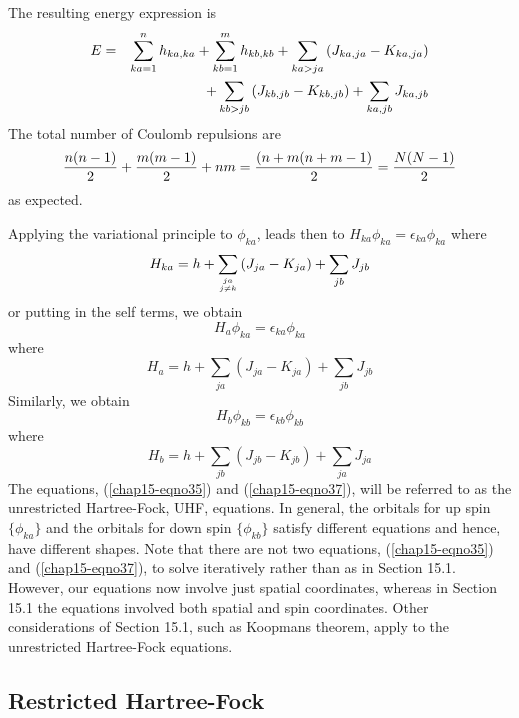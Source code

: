 The resulting energy expression is
\begin{eqnarray}
E &=& \sum^{n}_{ka=1} h_{ka,ka} + \sum^{m}_{kb=1} h_{kb,kb} + 
\sum_{ka>ja} \left( J_{ka,ja} - K_{ka,ja} \right)\cr
&& + \sum_{kb>jb} \left( J_{kb,jb} - K_{kb,jb} \right) + \sum_{ka,jb} 
J_{ka,jb}
\label{chap15-eqno34}
\end{eqnarray}
The total number of Coulomb repulsions are
\begin{equation}
{n(n-1) \over 2} + {m(m-1) \over 2} + nm = {(n+m(n+m-1) \over 2} = 
{N(N-1) \over 2}
\end{equation}
as expected.

Applying the variational principle to $\phi_{ka}$, leads then to 
$H_{ka} \phi_{ka} = \epsilon_{ka} \phi_{ka}$ where
\begin{equation}
H_{ka} = h + \sum_{{ja \atop j \not= k}} \left( J_{ja} - K_{ja} 
\right) + \sum_{jb} J_{jb}
\end{equation}
or putting in the self terms, we obtain
\begin{equation}
H_a \phi_{ka} = \epsilon_{ka} \phi_{ka}
\label{chap15-eqno35}
\end{equation}
where
\begin{equation}
H_a = h + \sum_{ja} \left( J_{ja} - K_{ja} \right) + \sum_{jb} 
J_{jb}
\label{chap15-eqno36}
\end{equation}
Similarly, we obtain
\begin{equation}
H_b \phi_{kb} = \epsilon_{kb} \phi_{kb}
\label{chap15-eqno37}
\end{equation}
where
\begin{equation}
H_b = h + \sum_{jb} \left( J_{jb} - K_{jb} \right) + \sum_{ja} 
J_{ja}
\label{chap15-eqno38}
\end{equation}
The equations, (\ref{chap15-eqno35}) and (\ref{chap15-eqno37}), will
be referred to as the unrestricted Hartree-Fock, UHF, equations.  In
general, the orbitals for up spin $\{\phi_{ka} \}$ and the orbitals
for down spin $\{ \phi_{kb} \}$ satisfy different equations and hence,
have different shapes.  Note that there are not two equations,
(\ref{chap15-eqno35}) and (\ref{chap15-eqno37}), to solve iteratively
rather than as in Section 15.1.  However, our equations now involve
just spatial coordinates, whereas in Section 15.1 the equations
involved both spatial and spin coordinates.  Other considerations of
Section 15.1, such as Koopmans theorem, apply to the unrestricted
Hartree-Fock equations.

\subsection{Restricted Hartree-Fock}

